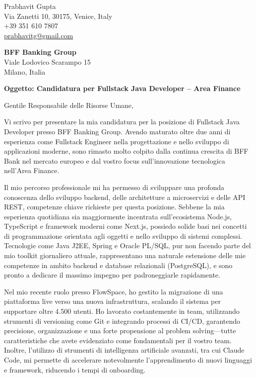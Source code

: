 \documentclass[a4paper,11pt]{article}
\begin{document}
\begin{flushright}
Prabhavit Gupta \\
Via Zanetti 10, 30175, Venice, Italy \\
+39 351 610 7807 \\
\href{mailto:prabhavitg@gmail.com}{prabhavitg@gmail.com}
\end{flushright}

\vspace{1cm}

\textbf{BFF Banking Group} \\
Viale Lodovico Scarampo 15 \\
Milano, Italia

\vspace{1cm}

\textbf{Oggetto: Candidatura per Fullstack Java Developer – Area Finance}

Gentile Responsabile delle Risorse Umane,

Vi scrivo per presentare la mia candidatura per la posizione di Fullstack Java Developer presso BFF Banking Group. Avendo maturato oltre due anni di esperienza come Fullstack Engineer nella progettazione e nello sviluppo di applicazioni moderne, sono rimasto molto colpito dalla continua crescita di BFF Bank nel mercato europeo e dal vostro focus sull'innovazione tecnologica nell'Area Finance.

Il mio percorso professionale mi ha permesso di sviluppare una profonda conoscenza dello sviluppo backend, delle architetture a microservizi e delle API REST, competenze chiave richieste per questa posizione. Sebbene la mia esperienza quotidiana sia maggiormente incentrata sull'ecosistema Node.js, TypeScript e framework moderni come Next.js, possiedo solide basi nei concetti di programmazione orientata agli oggetti e nello sviluppo di sistemi complessi. Tecnologie come Java J2EE, Spring e Oracle PL/SQL, pur non facendo parte del mio toolkit giornaliero attuale, rappresentano una naturale estensione delle mie competenze in ambito backend e database relazionali (PostgreSQL), e sono pronto a dedicare il massimo impegno per padroneggiarle rapidamente.

Nel mio recente ruolo presso FlowSpace, ho gestito la migrazione di una piattaforma live verso una nuova infrastruttura, scalando il sistema per supportare oltre 4.500 utenti. Ho lavorato costantemente in team, utilizzando strumenti di versioning come Git e integrando processi di CI/CD, garantendo precisione, organizzazione e una forte propensione al problem solving—tutte caratteristiche che avete evidenziato come fondamentali per il vostro team. Inoltre, l'utilizzo di strumenti di intelligenza artificiale avanzati, tra cui Claude Code, mi permette di accelerare notevolmente l'apprendimento di nuovi linguaggi e framework, riducendo i tempi di onboarding.
\end{document}

